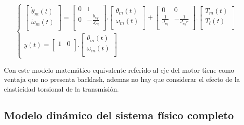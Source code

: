 \documentclass{article}
\begin{document}
\begin{equation}
\begin{cases}
    \begin{bmatrix}
        \dot{\theta}_{m}(t)\\
        \dot{\omega}_{m}(t)\\
    \end{bmatrix}
    =
    \begin{bmatrix}
        0 & 1\\
        0 & -\frac{b_{eq}}{J_{eq}}\\
    \end{bmatrix}.
    \begin{bmatrix}
        \theta_{m}(t)\\
        \omega_{m}(t)\\
    \end{bmatrix}
    +
    \begin{bmatrix}
        0 & 0\\
        \frac{1}{J_{eq}} & -\frac{1}{J_{eq}r}\\
    \end{bmatrix}.
    \begin{bmatrix}
        T_{m}(t)\\
        T_{l}(t)\\
    \end{bmatrix}\\
    y(t) = 
    \begin{bmatrix} 1 & 0\\ \end{bmatrix} .
    \begin{bmatrix} \theta_{m}(t)\\ \omega_{m}(t)\\ \end{bmatrix}
\end{cases}
\end{equation}

Con este modelo matemático equivalente referido al eje del motor tiene como 
ventaja que no presenta backlash, ademas no hay que considerar el efecto de 
la elasticidad torsional de la transmisión.


\subsection{Modelo dinámico del sistema físico completo}

\end{document}
